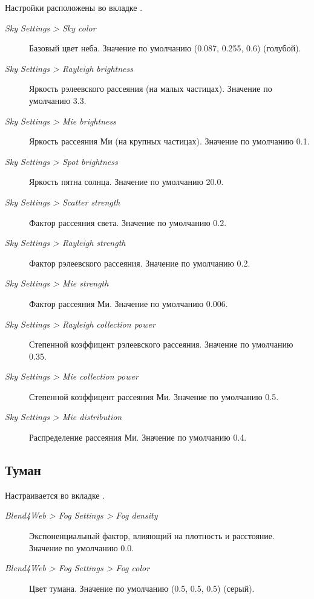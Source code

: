 \documentclass[a4paper,12pt,oneside]{sphinxmanual}
\begin{document}
Настройки расположены во вкладке .
\begin{description}
\item[{\emph{Sky Settings \textgreater{} Sky color}}] \leavevmode
Базовый цвет неба. Значение по умолчанию (0.087, 0.255, 0.6) (голубой).

\item[{\emph{Sky Settings \textgreater{} Rayleigh brightness}}] \leavevmode
Яркость рэлеевского рассеяния (на малых частицах). Значение по умолчанию 3.3.

\item[{\emph{Sky Settings \textgreater{} Mie brightness}}] \leavevmode
Яркость рассеяния Ми (на крупных частицах). Значение по умолчанию 0.1.

\item[{\emph{Sky Settings \textgreater{} Spot brightness}}] \leavevmode
Яркость пятна солнца. Значение по умолчанию 20.0.

\item[{\emph{Sky Settings \textgreater{} Scatter strength}}] \leavevmode
Фактор рассеяния света. Значение по умолчанию 0.2.

\item[{\emph{Sky Settings \textgreater{} Rayleigh strength}}] \leavevmode
Фактор рэлеевского рассеяния. Значение по умолчанию 0.2.

\item[{\emph{Sky Settings \textgreater{} Mie strength}}] \leavevmode
Фактор рассеяния Ми. Значение по умолчанию 0.006.

\item[{\emph{Sky Settings \textgreater{} Rayleigh collection power}}] \leavevmode
Степенной коэффицент рэлеевского рассеяния. Значение по умолчанию 0.35.

\item[{\emph{Sky Settings \textgreater{} Mie collection power}}] \leavevmode
Степенной коэффицент рассеяния Ми. Значение по умолчанию 0.5.

\item[{\emph{Sky Settings \textgreater{} Mie distribution}}] \leavevmode
Распределение рассеяния Ми. Значение по умолчанию 0.4.

\end{description}


\subsection{Туман}
\label{outdoor_rendering:id27}
Настраивается во вкладке .
\begin{description}
\item[{\emph{Blend4Web \textgreater{} Fog Settings \textgreater{} Fog density}}] \leavevmode
Экспоненциальный фактор, влияющий на плотность и расстояние. Значение по умолчанию 0.0.

\item[{\emph{Blend4Web \textgreater{} Fog Settings \textgreater{} Fog color}}] \leavevmode
Цвет тумана. Значение по умолчанию (0.5, 0.5, 0.5) (серый).

\end{description}
\end{document}

